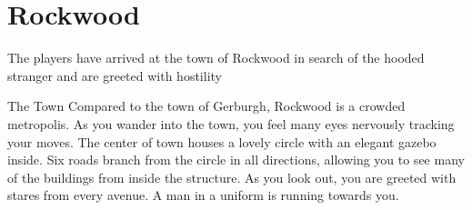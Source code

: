 \documentclass[10pt,twoside,twocolumn]{article}
\begin{document}
\selectfont %









\section{Rockwood}
The players have arrived at the town of Rockwood in search of the hooded stranger and are greeted with hostility

\begin{paperbox}{The Town}
Compared to the town of Gerburgh, Rockwood is a crowded metropolis.  As you wander into the town, you feel many eyes nervously tracking your moves.  The center of town houses a lovely circle with an elegant gazebo inside.  Six roads branch from the circle in all directions, allowing you to see many of the buildings from inside the structure.  As you look out, you are greeted with stares from every avenue.  A man in a uniform is running towards you.
\end{paperbox}
\end{document}
